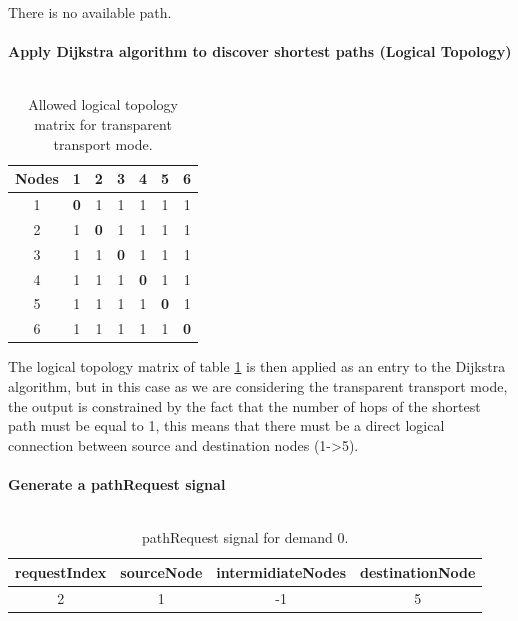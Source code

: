 There is no available path.\\ \\

\textbf{Apply Dijkstra algorithm to discover shortest paths (Logical Topology)}\\ \\
\begin{table}[H]
	\centering	
	\begin{tabular}{|c|c|c|c|c|c|c|}
		\hline
		\multicolumn{1}{|l|}{\textbf{Nodes}} & 1   & 2   & 3   & 4   & 5   & 6  \\ \hline
		1                           & \textbf{0}   & 1 & 1 & 1 & 1 & 1 \\ \hline
		2                           & 1 & \textbf{0}   & 1 & 1 & 1 & 1 \\ \hline
		3                           & 1 & 1 & \textbf{0}   & 1 & 1 & 1 \\ \hline
		4                           & 1 & 1 & 1 & \textbf{0}   & 1 & 1 \\ \hline
		5                           & 1 & 1 & 1 & 1 & \textbf{0}   & 1 \\ \hline
		6                           & 1 & 1 & 1 & 1 & 1 & \textbf{0}   \\ \hline
	\end{tabular}
	\caption{Allowed logical topology matrix for transparent transport mode.}
	\label{Transparentlogical_topology}
\end{table}

The logical topology matrix of table \ref{Transparentlogical_topology} is then applied as an entry to the Dijkstra algorithm, but in this case as we are considering the transparent transport mode, the output is constrained by the fact that the number of hops of the shortest path must be equal to 1, this means that there must be a direct logical connection between source and destination nodes (1->5).\\ \\

\textbf{Generate a pathRequest signal}\\ \\

\begin{table}[H]
	\centering
	\begin{tabular}{|c|c|c|c|}
		\hline
		requestIndex & sourceNode & intermidiateNodes & destinationNode \\ \hline
		2            & 1          & -1                 & 5               \\ \hline
	\end{tabular}
	\caption{pathRequest signal for demand 0.}
\end{table} 

